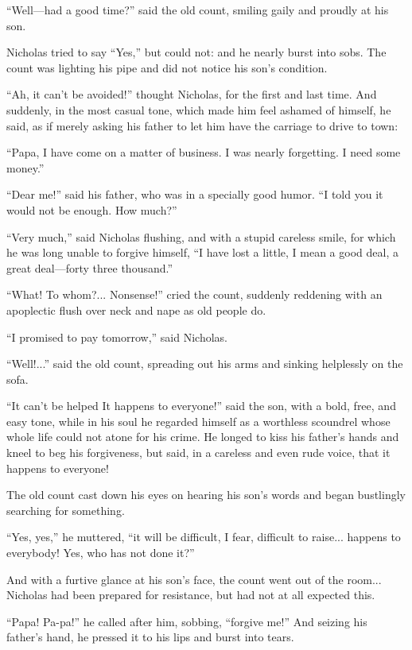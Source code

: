 ``Well---had a good time?'' said the old count, smiling gaily and
proudly at his son.

Nicholas tried to say ``Yes,'' but could not: and he nearly burst
into sobs. The count was lighting his pipe and did not notice his
son's condition.

``Ah, it can't be avoided!'' thought Nicholas, for the first and
last time. And suddenly, in the most casual tone, which made him
feel ashamed of himself, he said, as if merely asking his father
to let him have the carriage to drive to town:

``Papa, I have come on a matter of business. I was nearly
forgetting. I need some money.''

``Dear me!'' said his father, who was in a specially good
humor. ``I told you it would not be enough. How much?''

``Very much,'' said Nicholas flushing, and with a stupid careless
smile, for which he was long unable to forgive himself, ``I have
lost a little, I mean a good deal, a great deal---forty three
thousand.''

``What! To whom?... Nonsense!'' cried the count, suddenly
reddening with an apoplectic flush over neck and nape as old
people do.

``I promised to pay tomorrow,'' said Nicholas.

``Well!...'' said the old count, spreading out his arms and
sinking helplessly on the sofa.

``It can't be helped It happens to everyone!'' said the son, with
a bold, free, and easy tone, while in his soul he regarded
himself as a worthless scoundrel whose whole life could not atone
for his crime. He longed to kiss his father's hands and kneel to
beg his forgiveness, but said, in a careless and even rude voice,
that it happens to everyone!

The old count cast down his eyes on hearing his son's words and
began bustlingly searching for something.

``Yes, yes,'' he muttered, ``it will be difficult, I fear,
difficult to raise... happens to everybody! Yes, who has not done
it?''

And with a furtive glance at his son's face, the count went out
of the room... Nicholas had been prepared for resistance, but had
not at all expected this.

``Papa! Pa-pa!'' he called after him, sobbing, ``forgive me!''
And seizing his father's hand, he pressed it to his lips and
burst into tears.

